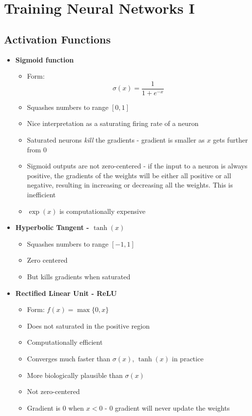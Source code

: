 \section{Training Neural Networks I}
\subsection{Activation Functions}
\begin{itemize}
	\item \textbf{Sigmoid function}
	\begin{itemize}
		\item Form:$$\sigma(x) = \frac{1}{1 + e^{-x}}$$
		\item Squashes numbers to range $[0, 1]$
		\item Nice interpretation as a saturating firing rate of a neuron
		\item Saturated neurons \textit{kill} the gradients - gradient is smaller as $x$ gets further from $0$
		\item Sigmoid outputs are not zero-centered - if the input to a neuron is always positive, the gradients of the weights will be either all positive or all negative, resulting in increasing or decreasing all the weights. This is inefficient
		\item $\exp(x)$ is computationally expensive
	\end{itemize}
	\item \textbf{Hyperbolic Tangent - $\tanh(x)$}
	\begin{itemize}
		\item Squashes numbers to range $[-1, 1]$
		\item Zero centered
		\item But kills gradients when saturated
	\end{itemize}
	\item \textbf{Rectified Linear Unit - ReLU}
	\begin{itemize}
		\item Form: $f(x) = \max\{0, x\}$
		\item Does not saturated in the positive region
		\item Computationally efficient
		\item Converges much faster than $\sigma(x)$, $\tanh(x)$ in practice
		\item More biologically plausible than $\sigma(x)$
		\item Not zero-centered
		\item Gradient is $0$ when $x < 0$ - $0$ gradient will never update the weights

\end{itemize}
\end{itemize}
